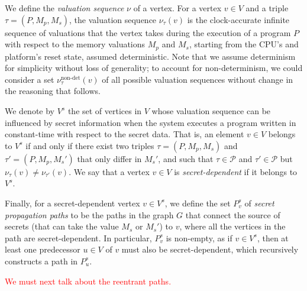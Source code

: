 We define the \emph{valuation sequence} $\nu$ of a vertex.
For a vertex $v \in V$ and a triple $\tau = (P, M_p, M_s)$, the valuation sequence $\nu_\tau(v)$ is the clock-accurate infinite sequence of valuations that the vertex takes during the execution of a program $P$ with respect to the memory valuations $M_p$ and $M_s$, starting from the CPU's and platform's reset state, assumed deterministic.
Note that we assume determinism for simplicity without loss of generality; to account for non-determinism, we could consider a set $\nu_\tau^{\text{non-det}}(v)$ of all possible valuation sequences without change in the reasoning that follows.

We denote by $V^s$ the set of vertices in $V$ whose valuation sequence can be influenced by secret information when the system executes a program written in constant-time with respect to the secret data.
That is, an element $v \in V$ belongs to $V^s$ if and only if there exist two triples $\tau = (P, M_p, M_s)$ and $\tau' = (P, M_p, M_s')$ that only differ in $M_s'$, and such that $\tau \in \mathcal{P}$ and $\tau' \in \mathcal{P}$ but $\nu_\tau(v) \neq \nu_{\tau'}(v)$.
We say that a vertex $v \in V$ is \emph{secret-dependent} if it belongs to $V^s$.

Finally, for a secret-dependent vertex $v \in V^s$, we define the set $P^s_v$ of \emph{secret propagation paths} to be the paths in the graph $G$ that connect the source of secrets (that can take the value $M_s$ or $M_s'$) to $v$, where all the vertices in the path are secret-dependent.
In particular, $P^s_v$ is non-empty, as if $v \in V^s$, then at least one predecessor $u \in V$ of $v$ must also be secret-dependent, which recursively constructs a path in $P^s_u$.

\textcolor{red}{We must next talk about the reentrant paths.}



